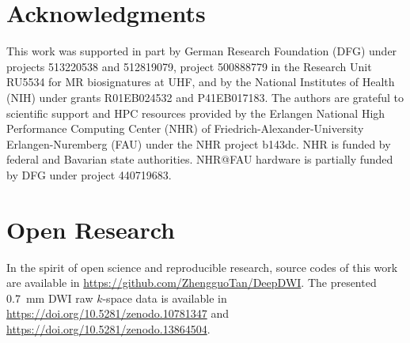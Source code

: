 \documentclass[AMA,STIX2COL,Linenumberson]{MRM}
\begin{document}
\section*{Acknowledgments}
This work was supported in part by
German Research Foundation (DFG)
under projects 513220538 and 512819079,
project 500888779 in the Research Unit RU5534
for MR biosignatures at UHF,
and by the National Institutes of Health (NIH)
under grants R01EB024532 and P41EB017183.
The authors are grateful to scientific support and HPC resources
provided by
the Erlangen National High Performance Computing Center (NHR)
of Friedrich-Alexander-University Erlangen-Nuremberg (FAU)
under the NHR project b143dc.
NHR is funded by federal and Bavarian state authorities.
NHR@FAU hardware is partially funded by
DFG under project 440719683.

\section*{Open Research}
In the spirit of open science and reproducible research,
source codes of this work are available in \url{https://github.com/ZhengguoTan/DeepDWI}.
The presented \SI{0.7}{mm} DWI raw $k$-space data is available in 
\url{https://doi.org/10.5281/zenodo.10781347} and 
\url{https://doi.org/10.5281/zenodo.13864504}.

\vfill\pagebreak

\end{document}
